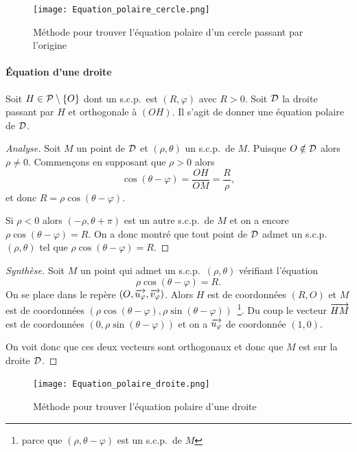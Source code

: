\begin{figure}[!h]
    \centering
    \texttt{[image: Equation\_polaire\_cercle.png]}
    \caption{Méthode pour trouver l'équation polaire d'un cercle passant par l'origine}
    \label{fig:cerclepolaire}
\end{figure}
%
\paragraph{Équation d'une droite}
\label{par:eqdroite}
Soit \(H \in \P\setminus\{O\}\) dont un s.c.p.\ est \((R,\varphi)\) avec \(R>0\). Soit \(\Dr\) la droite passant par \(H\) et orthogonale à \((OH)\). Il s'agit de donner une équation polaire de \(\Dr\).
\begin{proof}[Analyse]
  Soit \(M\) un point de \(\Dr\) et \((\rho,\theta)\) un s.c.p.\ de \(M\). Puisque \(O \notin \Dr\) alors \(\rho \neq 0\). Commençons en supposant que \(\rho>0\) alors
  \begin{equation}
    \cos(\theta-\varphi)=\frac{OH}{OM}=\frac{R}{\rho},
  \end{equation}
  et donc \(R=\rho \cos(\theta-\varphi)\). 

  Si \(\rho<0\) alors \((-\rho,\theta+\pi)\) est un autre s.c.p.\ de \(M\) et on a encore \(\rho\cos(\theta-\varphi)=R\). On a donc montré que tout point de \(\Dr\) admet un s.c.p.\ \((\rho, \theta)\) tel que \(\rho\cos(\theta-\varphi)=R\).
\end{proof}
\begin{proof}[Synthèse]
Soit \(M\) un point qui admet un s.c.p.\ \((\rho,\theta)\) vérifiant l'équation
\begin{equation}
  \rho\cos(\theta-\varphi)=R.
\end{equation}
On se place dans le repère \((O,\vect{u_\varphi}, \vect{v_\varphi})\). Alors \(H\) est de coordonnées \((R,O)\) et \(M\) est de coordonnées \((\rho\cos(\theta-\varphi), \rho\sin(\theta-\varphi))\)~\footnote{parce que \((\rho, \theta-\varphi)\) est un s.c.p.\ de \(M\)}. Du coup le vecteur \(\vect{HM}\) est de coordonnées \((0, \rho\sin(\theta-\varphi))\) et on a \(\vect{u_\varphi}\) de coordonnée \((1,0)\). 

On voit donc que ces deux vecteurs sont orthogonaux et donc que \(M\) est sur la droite \(\Dr\).
\end{proof}
\begin{figure}[!h]
    \centering
    \texttt{[image: Equation\_polaire\_droite.png]}
    \caption{Méthode pour trouver l'équation polaire d'une droite}
    \label{fig:droitepolaire}
\end{figure}

